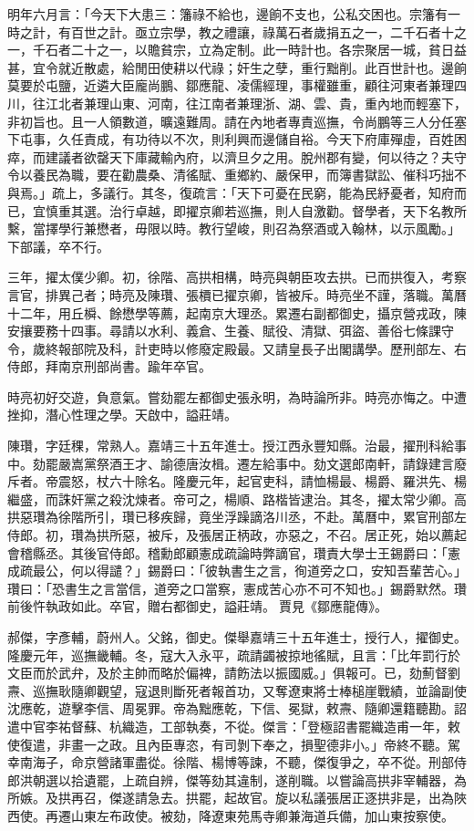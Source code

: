 \begin{pinyinscope}
明年六月言：「今天下大患三：籓祿不給也，邊餉不支也，公私交困也。宗籓有一時之計，有百世之計。亟立宗學，教之禮讓，祿萬石者歲捐五之一，二千石者十之一，千石者二十之一，以贍貧宗，立為定制。此一時計也。各宗聚居一城，貧日益甚，宜令就近散處，給閒田使耕以代祿；奸生之孽，重行黜削。此百世計也。邊餉莫要於屯鹽，近遴大臣龐尚鵬、鄒應龍、凌儒經理，事權雖重，顧往河東者兼理四川，往江北者兼理山東、河南，往江南者兼理浙、湖、雲、貴，重內地而輕塞下，非初旨也。且一人領數道，曠遠難周。請在內地者專責巡撫，令尚鵬等三人分任塞下屯事，久任責成，有功待以不次，則利興而邊儲自裕。今天下府庫殫虛，百姓困瘁，而建議者欲罄天下庫藏輸內府，以濟旦夕之用。脫州郡有變，何以待之？夫守令以養民為職，要在勸農桑、清徭賦、重鄉約、嚴保甲，而簿書獄訟、催科巧拙不與焉。」疏上，多議行。其冬，復疏言：「天下可憂在民窮，能為民紓憂者，知府而已，宜慎重其選。治行卓越，即擢京卿若巡撫，則人自激勸。督學者，天下名教所繫，當擇學行兼懋者，毋限以時。教行望峻，則召為祭酒或入翰林，以示風勵。」下部議，卒不行。

三年，擢太僕少卿。初，徐階、高拱相構，時亮與朝臣攻去拱。已而拱復入，考察言官，排異己者；時亮及陳瓚、張檟已擢京卿，皆被斥。時亮坐不謹，落職。萬曆十二年，用丘橓、餘懋學等薦，起南京大理丞。累遷右副都御史，攝京營戎政，陳安攘要務十四事。尋請以水利、義倉、生養、賦役、清獄、弭盜、善俗七條課守令，歲終報部院及科，計吏時以修廢定殿最。又請皇長子出閣講學。歷刑部左、右侍郎，拜南京刑部尚書。踰年卒官。

時亮初好交遊，負意氣。嘗劾罷左都御史張永明，為時論所非。時亮亦悔之。中遭挫抑，潛心性理之學。天啟中，謚莊靖。

陳瓚，字廷稞，常熟人。嘉靖三十五年進士。授江西永豐知縣。治最，擢刑科給事中。劾罷嚴嵩黨祭酒王才、諭德唐汝楫。遷左給事中。劾文選郎南軒，請錄建言廢斥者。帝震怒，杖六十除名。隆慶元年，起官吏科，請恤楊最、楊爵、羅洪先、楊繼盛，而誅奸黨之殺沈煉者。帝可之，楊順、路楷皆逮治。其冬，擢太常少卿。高拱惡瓚為徐階所引，瓚已移疾歸，竟坐浮躁謫洛川丞，不赴。萬曆中，累官刑部左侍郎。初，瓚為拱所惡，被斥，及張居正柄政，亦惡之，不召。居正死，始以薦起會稽縣丞。其後官侍郎。稽勳郎顧憲成疏論時弊謫官，瓚責大學士王錫爵曰：「憲成疏最公，何以得譴？」錫爵曰：「彼執書生之言，徇道旁之口，安知吾輩苦心。」瓚曰：「恐書生之言當信，道旁之口當察，憲成苦心亦不可不知也。」錫爵默然。瓚前後忤執政如此。卒官，贈右都御史，謚莊靖。賈見《鄒應龍傳》。

郝傑，字彥輔，蔚州人。父銘，御史。傑舉嘉靖三十五年進士，授行人，擢御史。隆慶元年，巡撫畿輔。冬，寇大入永平，疏請蠲被掠地徭賦，且言：「比年罰行於文臣而於武弁，及於主帥而略於偏裨，請飭法以振國威。」俱報可。已，劾薊督劉燾、巡撫耿隨卿觀望，寇退則斷死者報首功，又奪遼東將士棒槌崖戰績，並論副使沈應乾，遊擊李信、周冕罪。帝為黜應乾，下信、冕獄，敕燾、隨卿還籍聽勘。詔遣中官李祐督蘇、杭織造，工部執奏，不從。傑言：「登極詔書罷織造甫一年，敕使復遣，非畫一之政。且內臣專恣，有司剝下奉之，損聖德非小。」帝終不聽。駕幸南海子，命京營諸軍盡從。徐階、楊博等諫，不聽，傑復爭之，卒不從。刑部侍郎洪朝選以拾遺罷，上疏自辨，傑等劾其違制，遂削職。以嘗論高拱非宰輔器，為所嫉。及拱再召，傑遂請急去。拱罷，起故官。旋以私議張居正逐拱非是，出為陜西使。再遷山東左布政使。被劾，降遼東苑馬寺卿兼海道兵備，加山東按察使。


\end{pinyinscope}
